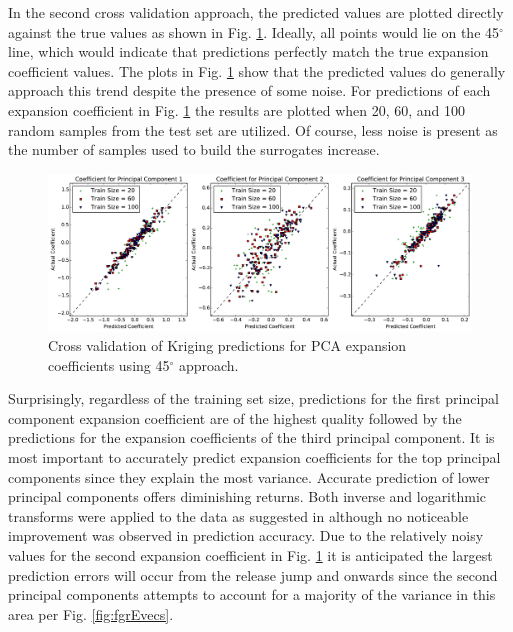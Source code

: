 In the second cross validation approach, the predicted values are plotted directly against the true values as shown in Fig. \ref{fig:xval_45degree}. Ideally, all points would lie on the 45$^{\circ}$ line, which would indicate that predictions perfectly match the true expansion coefficient values. The plots in Fig. \ref{fig:xval_45degree} show that the predicted values do generally approach this trend despite the presence of some noise. For predictions of each expansion coefficient in Fig. \ref{fig:xval_45degree} the results are plotted when 20, 60, and 100 random samples from the test set are utilized. Of course, less noise is present as the number of samples used to build the surrogates increase.  
\begin{figure}
\caption{\label{fig:xval_45degree}
Cross validation of Kriging predictions for \ac{PCA} expansion coefficients using 45$^\circ$ approach.}
 \begin{center}
  \includegraphics[scale=.4]{./Chapter4/xval_45degree.pdf}
 \end{center}
\end{figure}
Surprisingly, regardless of the training set size, predictions for the first principal component expansion coefficient are of the highest quality followed by the predictions for the expansion coefficients of the third principal component. It is most important to accurately predict expansion coefficients for the top principal components since they explain the most variance. Accurate prediction of lower principal components offers diminishing returns. Both inverse and logarithmic transforms were applied to the data as suggested in \cite{Jones_Schonlau} although no noticeable improvement was observed in prediction accuracy. Due to the relatively noisy values for the second expansion coefficient in Fig. \ref{fig:xval_45degree} it is anticipated the largest prediction errors will occur from the release jump and onwards since the second principal components attempts to account for a majority of the variance in this area per Fig. \ref{fig:fgrEvecs}.

